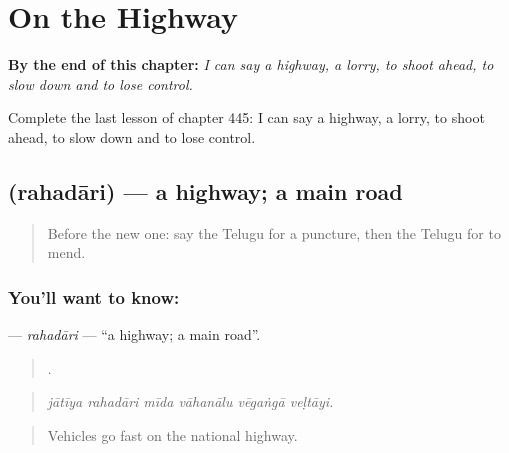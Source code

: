 
\chapter{On the Highway}
\label{ch:te-on-the-highway}

\begin{chapteropening}
\textbf{By the end of this chapter:} \emph{I can say a highway, a lorry, to shoot ahead, to slow down and to lose control.}

Complete the last lesson of chapter 445: I can say a highway, a lorry, to shoot ahead, to slow down and to lose control.
\end{chapteropening}

\section[\texorpdfstring{\te{రహదారి} (rahadāri)}{రహదారి (rahadāri)}]{ (rahadāri) — a highway; a main road}

\label{lesson:TE-C445-rahadari}



\begin{quote}
Before the new one: say the Telugu for a puncture, then the Telugu for to mend.
\end{quote}

\subsection*{You'll want to know: }
\textbf{} — \emph{rahadāri} — \textquotedblleft{}a highway; a main road\textquotedblright{}.

\begin{quote}
     .
\end{quote}

\begin{quote}
\emph{jātīya rahadāri mīda vāhanālu vēgaṅgā veḷtāyi.}
\end{quote}

\begin{quote}
Vehicles go fast on the national highway.
\end{quote}

